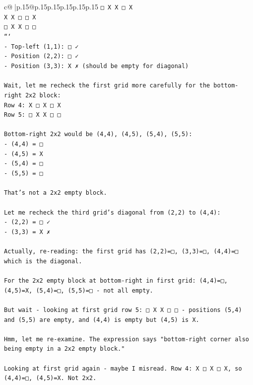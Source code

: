 \documentclass{article}
\begin{document}
{\begin{supertabular}{c@{$\;$}|p{.15\linewidth}@{}p{.15\linewidth}p{.15\linewidth}p{.15\linewidth}p{.15\linewidth}p{.15\linewidth}}
{{{\texttt{□ X X □ X} \\
\texttt{X X □ □ X} \\
\texttt{□ X X □ □} \\
\texttt{```} \\
\texttt{{-} Top{-}left (1,1): □ ✓} \\
\texttt{{-} Position (2,2): □ ✓} \\
\texttt{{-} Position (3,3): X ✗ (should be empty for diagonal)} \\
\\ 
\texttt{Wait, let me recheck the first grid more carefully for the bottom{-}right 2x2 block:} \\
\texttt{Row 4: X □ X □ X} \\
\texttt{Row 5: □ X X □ □} \\
\\ 
\texttt{Bottom{-}right 2x2 would be (4,4), (4,5), (5,4), (5,5):} \\
\texttt{{-} (4,4) = □} \\
\texttt{{-} (4,5) = X} \\
\texttt{{-} (5,4) = □} \\
\texttt{{-} (5,5) = □} \\
\\ 
\texttt{That's not a 2x2 empty block.} \\
\\ 
\texttt{Let me recheck the third grid's diagonal from (2,2) to (4,4):} \\
\texttt{{-} (2,2) = □ ✓} \\
\texttt{{-} (3,3) = X ✗} \\
\\ 
\texttt{Actually, re{-}reading: the first grid has (2,2)=□, (3,3)=□, (4,4)=□ which is the diagonal.} \\
\\ 
\texttt{For the 2x2 empty block at bottom{-}right in first grid: (4,4)=□, (4,5)=X, (5,4)=□, (5,5)=□ {-} not all empty.} \\
\\ 
\texttt{But wait {-} looking at first grid row 5: □ X X □ □ {-} positions (5,4) and (5,5) are empty, and (4,4) is empty but (4,5) is X.} \\
\\ 
\texttt{Hmm, let me re{-}examine. The expression says "bottom{-}right corner also being empty in a 2x2 empty block." } \\
\\ 
\texttt{Looking at first grid again {-} maybe I misread. Row 4: X □ X □ X, so (4,4)=□, (4,5)=X. Not 2x2.} \\
}}}
\end{supertabular}}
\end{document}

